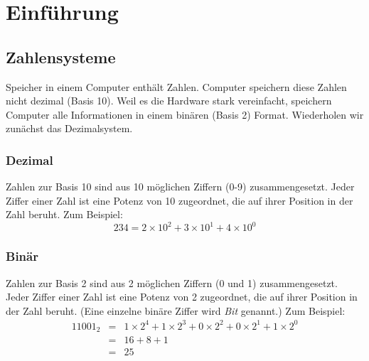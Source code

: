 \chapter{Einf\"{u}hrung \label{sec:intro}}

\section{Zahlensysteme}

Speicher in einem Computer enth\"{a}lt Zahlen. Computer speichern diese
Zahlen nicht dezimal (Basis 10). Weil es die Hardware stark
vereinfacht, speichern Computer alle Informationen in einem bin\"{a}ren
(Basis 2) Format. Wiederholen wir zun\"{a}chst das Dezimalsystem.

\subsection{Dezimal}

Zahlen zur Basis 10 sind aus 10 m\"{o}glichen Ziffern (0-9)
zusammengesetzt. Jeder Ziffer einer Zahl ist eine Potenz von 10
zugeordnet, die auf ihrer Position in der Zahl beruht. Zum Beispiel:
\begin{displaymath}
234 = 2 \times 10^2 + 3 \times 10^1 + 4 \times 10^0
\end{displaymath}

\subsection{Bin\"{a}r}

Zahlen zur Basis 2 sind aus 2 m\"{o}glichen Ziffern (0 und 1)
zusammengesetzt. Jeder Ziffer einer Zahl ist eine Potenz von 2
zugeordnet, die auf ihrer Position in der Zahl beruht. (Eine
einzelne bin\"{a}re Ziffer wird \emph{Bit}  genannt.) Zum
Beispiel:
\begin{eqnarray*}
11001_2 & = & 1 \times 2^4 + 1 \times 2^3 + 0 \times 2^2 + 0 \times 2^1
              + 1 \times 2^0 \\
 & = & 16 + 8 + 1 \\
 & = & 25
\end{eqnarray*}


